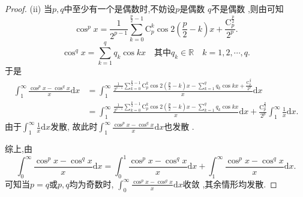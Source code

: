 \documentclass[../../main.tex]{subfiles}
\begin{document}
\begin{proof}
(ii) 当$p,q$中至少有一个是偶数时,不妨设$p$是偶数 $q$不是偶数 ,则由可知  
\[
\cos ^px=\frac{1}{2^{p-1}}\sum_{k=0}^{\frac{p}{2}-1}{\mathrm{C}_{p}^{k}\cos 2\left( \frac{p}{2}-k \right) x}+\frac{\mathrm{C}_{p}^{\frac{p}{2}}}{2^p}.
\]  
\[
\cos ^qx=\sum_{k=1}^q{q_k\cos kx} \quad \text{其中}q_k\in \mathbb{R} \quad k=1,2,\cdots,q.
\] 
于是
\begin{align*}
\int_1^{\infty}{\frac{\cos ^px-\cos ^qx}{x}\mathrm{d}x}&=\int_1^{\infty}{\frac{\frac{1}{2^{p-1}}\sum\limits_{k=0}^{\frac{p}{2}-1}{\mathrm{C}_{p}^{k}\cos 2\left( \frac{p}{2}-k \right) x}-\sum\limits_{k=1}^q{q_k\cos kx}+\frac{\mathrm{C}_{p}^{\frac{p}{2}}}{2^p}}{x}\mathrm{d}x}\\
&=\int_1^{\infty}{\frac{\frac{1}{2^{p-1}}\sum\limits_{k=0}^{\frac{p}{2}-1}{\mathrm{C}_{p}^{k}\cos 2\left( \frac{p}{2}-k \right) x}-\sum\limits_{k=1}^q{q_k\cos kx}}{x}\mathrm{d}x}+\frac{\mathrm{C}_{p}^{\frac{p}{2}}}{2^p}\int_1^{\infty}{\frac{1}{x}\mathrm{d}x}.
\end{align*}  
由于$\int_1^{\infty}{\frac{1}{x}\mathrm{d}x}$发散, 故此时$\int_1^{\infty}{\frac{\cos ^px-\cos ^qx}{x}\mathrm{d}x}$也发散  .

综上,由  
\[
\int_0^{\infty}{\frac{\cos ^px-\cos ^qx}{x}\mathrm{d}x}=\int_0^1{\frac{\cos ^px-\cos ^qx}{x}\mathrm{d}x}+\int_1^{\infty}{\frac{\cos ^px-\cos ^qx}{x}\mathrm{d}x}.
\]
可知当$p=q$或$p,q$均为奇数时, $\int_0^{\infty}{\frac{\cos ^px-\cos ^qx}{x}\mathrm{d}x}$收敛 ,其余情形均发散.

\end{proof}
\end{document}
